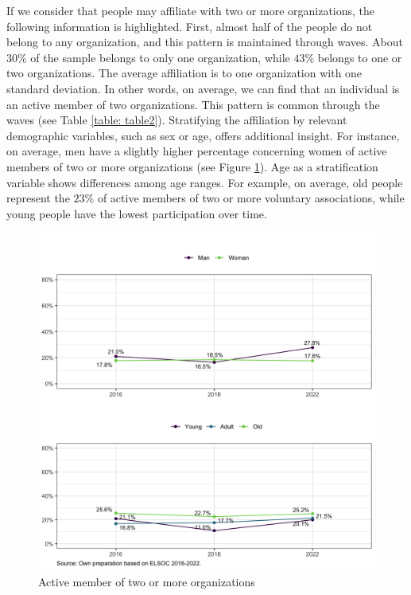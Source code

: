 If we consider that people may affiliate with two or more organizations, the following information is highlighted. First, almost half of the people do not belong to any organization, and this pattern is maintained through waves. About $30\%$ of the sample belongs to only one organization, while $43\%$ belongs to one or two organizations. The average affiliation is to one organization with one standard deviation. In other words, on average, we can find that an individual is an active member of two organizations. This pattern is common through the waves (see Table \ref{table: table2}). Stratifying the affiliation by relevant demographic variables, such as sex or age, offers additional insight. For instance, on average, men have a slightly higher percentage concerning women of active members of two or more organizations (see Figure \ref{fig:fig9}). Age as a stratification variable shows differences among age ranges. For example, on average, old people represent the $23\%$ of active members of two or more voluntary associations, while young people have the lowest participation over time.

\begin{figure}[H]
    \centering
    \includegraphics[width=16cm]{output/fig9.png}
    \caption{Active member of two or more organizations}
    \label{fig:fig9}
\end{figure}


